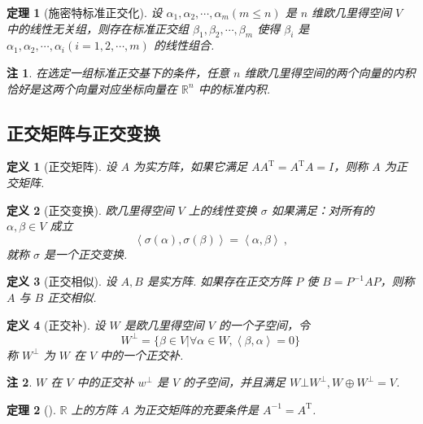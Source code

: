 \documentclass[zihao=-4,UTF8,linespread=1.8,nothm]{aytony_base}
\newtheorem{theorem}{\indent 定理}[subsection]
\newtheorem{definition}{\indent 定义}[subsection]
\newtheorem*{remark}{\indent 注}
\begin{document}
\begin{theorem}[施密特标准正交化]
    设 ${\alpha}_1, {\alpha}_2, \cdots, {\alpha}_{m}(m \leqslant n)$ 是 $n$ 维欧几里得空间 $V$ 中的线性无关组，则存在标准正交组 ${\beta}_1, {\beta}_2, \cdots, {\beta}_{m}$ 使得 $\beta_i$ 是 ${\alpha}_1, {\alpha}_2, \cdots, {\alpha}_{i}(i = 1, 2, \cdots, m)$ 的线性组合.
\end{theorem}

\begin{remark}
    在选定一组标准正交基下的条件，任意 $n$ 维欧几里得空间的两个向量的内积恰好是这两个向量对应坐标向量在 $\mathbb{R}^n$ 中的标准内积.
\end{remark}

\subsection{正交矩阵与正交变换}

\begin{definition}[正交矩阵]
    设 $A$ 为实方阵，如果它满足 $AA ^{\mathrm{T}} = A ^{\mathrm{T}}A = I$，则称 $A$ 为正交矩阵.
\end{definition}

\begin{definition}[正交变换]
    欧几里得空间 $V$ 上的线性变换 $\sigma$ 如果满足：对所有的 $\alpha, \beta \in V$ 成立 $$
        \left<\sigma(\alpha), \sigma(\beta)\right> = \left<\alpha, \beta\right>\ ,
    $$ 就称 $\sigma$ 是一个正交变换.
\end{definition}

\begin{definition}[正交相似]
    设 $A,B$ 是实方阵. 如果存在正交方阵 $P$ 使 $B = P^{-1}AP$，则称 $A$ 与 $B$ 正交相似.
\end{definition}

\begin{definition}[正交补]
    设 $W$ 是欧几里得空间 $V$ 的一个子空间，令 $$
        W^{\bot} = \{\beta \in V | \forall \alpha \in W, \left<\beta, \alpha\right> = 0\}\,
    $$ 称 $W ^{\bot}$ 为 $W$ 在 $V$ 中的一个正交补.
\end{definition}

\begin{remark}
    $W$ 在 $V$ 中的正交补 $w ^{\bot}$ 是 $V$ 的子空间，并且满足 $W \bot W ^{\bot}, W \oplus W ^{\bot} = V$.
\end{remark}

\begin{theorem}[]
    $\mathbb{R}$ 上的方阵 $A$ 为正交矩阵的充要条件是 $A^{-1} = A ^{\mathrm{T}}$.
\end{theorem}
\end{document}
